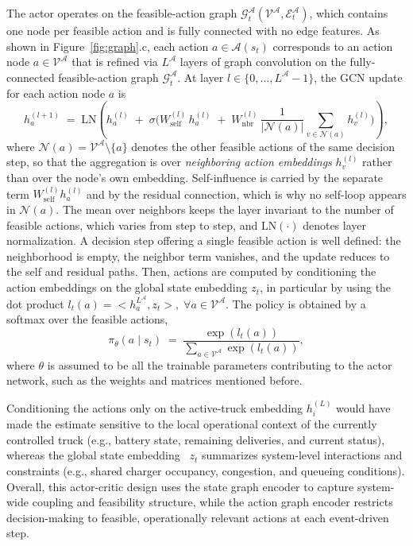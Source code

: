 \documentclass[a4paper,fleqn]{cas-sc}
\begin{document}
The actor operates on the feasible-action graph $\mathcal{G}_t^\mathcal{A}({\mathcal{V}^\mathcal{A}},\mathcal{E}_t^{\mathcal{A}})$, which contains one node per feasible action and is fully connected with no edge features.
As shown in Figure~\ref{fig:graph}.c, each action $a\in\mathcal{A}(s_t)$ corresponds to an action node $a\in\mathcal{V}^{\mathcal{A}}$ 
that is refined via $L^{\mathcal{A}}$ layers of graph convolution on the fully-connected feasible-action graph $\mathcal{G}_t^{\mathcal{A}}$. At layer $l\in\{0,\dots,L^{\mathcal{A}}-1\}$, the GCN update for each action node $a$ is
\begin{equation}
h_{a}^{(l+1)}
\;=\;
\mathrm{LN}\!\left(
h_{a}^{(l)} \;+\; \sigma\!\Big(
W_{\mathrm{self}}^{(l)}\,h_{a}^{(l)}
\;+\;
W_{\mathrm{nbr}}^{(l)}\,\frac{1}{|\mathcal{N}(a)|}\!\!\sum_{v\in\mathcal{N}(a)}\!\! h_{v}^{(l)}
\Big)\right),
\label{eq:action_gcn}
\end{equation}
where $\mathcal{N}(a)=\mathcal{V}^{\mathcal{A}}\setminus\{a\}$ denotes the other feasible actions of the same decision step, so that the aggregation is over \emph{neighboring action embeddings} $h_v^{(l)}$ rather than over the node's own embedding. Self-influence is carried by the separate term $W_{\mathrm{self}}^{(l)}h_a^{(l)}$ and by the residual connection, which is why no self-loop appears in $\mathcal{N}(a)$. The mean over neighbors keeps the layer invariant to the number of feasible actions, which varies from step to step, and $\mathrm{LN}(\cdot)$ denotes layer normalization. A decision step offering a single feasible action is well defined: the neighborhood is empty, the neighbor term vanishes, and the update reduces to the self and residual paths.
Then, actions are computed by conditioning the action embeddings on the global state embedding $z_t$, in particular by using the dot product $l_t(a) = <h_{a}^{L^{\mathcal{A}}}, z_t>, \; \forall  a\in\mathcal{V}^{\mathcal{A}}$.
The policy is obtained by a softmax over the feasible actions,
\begin{equation}
\pi_{\theta}(a\mid s_t)\;=\;\frac{\exp(l_t(a))}{\sum_{a\in\mathcal{V}^{\mathcal{A}}}\exp(l_t(a))},
\label{eq:actor_policy}
\end{equation}
where $\theta$ is assumed to be all the trainable parameters contributing to the actor network, such as the weights and matrices mentioned before.

Conditioning the actions only on the active-truck embedding $h_{i}^{(L)}$ would have made the estimate sensitive to the local operational context of the currently controlled truck (e.g., battery state, remaining deliveries, and current status), whereas the global state embedding~\cite{orfanoudakis2026gnndt} $z_t$ summarizes system-level interactions and constraints (e.g., shared charger occupancy, congestion, and queueing conditions).
Overall, this actor-critic design uses the state graph encoder to capture system-wide coupling and feasibility structure, while the action graph encoder restricts decision-making to feasible, operationally relevant actions at each event-driven step.
\end{document}
